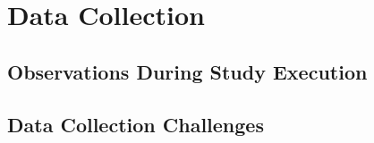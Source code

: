 \section{Data Collection} \label{sec:data_collection}

\subsection{Observations During Study Execution} \label{ssec:observations}

\subsection{Data Collection Challenges} \label{ssec:data_collection}
